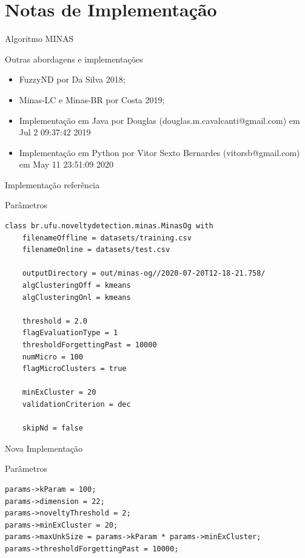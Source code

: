 \documentclass[aspectratio=43,10pt]{beamer}
\begin{document}

\section{Notas de Implementação}

\begin{frame}[fragile]{Algoritmo MINAS}
  \begin{alertblock}{Outras abordagens e implementações}
    \begin{itemize}%
      \item FuzzyND por Da Silva 2018;
      \item Minas-LC e Minas-BR por Costa 2019;
      \item Implementação em Java por Douglas (douglas.m.cavalcanti@gmail.com) em Jul 2 09:37:42 2019
      \item Implementação em Python por Vitor Sexto Bernardes (vitorsb@gmail.com) em May 11 23:51:09 2020
    \end{itemize}
  \end{alertblock}
\end{frame}


\begin{frame}[fragile]{Implementação referência}
  \begin{alertblock}{Parâmetros}
    \begin{Verbatim}[fontsize=\footnotesize]
class br.ufu.noveltydetection.minas.MinasOg with
	filenameOffline = datasets/training.csv
	filenameOnline = datasets/test.csv

	outputDirectory = out/minas-og//2020-07-20T12-18-21.758/
	algClusteringOff = kmeans
	algClusteringOnl = kmeans

	threshold = 2.0
	flagEvaluationType = 1
	thresholdForgettingPast = 10000
	numMicro = 100
	flagMicroClusters = true

	minExCluster = 20
	validationCriterion = dec

	skipNd = false
    \end{Verbatim}
  \end{alertblock}
\end{frame}
\begin{frame}[fragile]{Nova Implementação}
  \begin{alertblock}{Parâmetros}
    \begin{Verbatim}[fontsize=\small]
params->kParam = 100;
params->dimension = 22;
params->noveltyThreshold = 2;
params->minExCluster = 20;
params->maxUnkSize = params->kParam * params->minExCluster;
params->thresholdForgettingPast = 10000;
    \end{Verbatim}
  \end{alertblock}
\end{frame}
\end{document}
